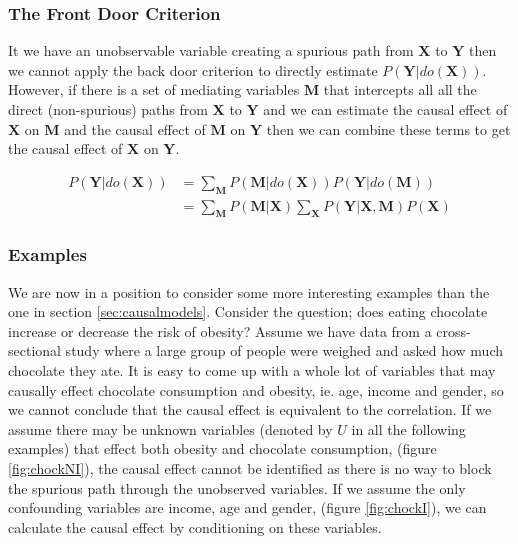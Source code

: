 \documentclass[11pt,a4paper]{article}
\begin{document}
\subsubsection{The Front Door Criterion}
It we have an unobservable variable creating a spurious path from $\boldsymbol{X}$ to $\boldsymbol{Y}$ then we cannot apply the back door criterion to directly estimate $P(\boldsymbol{Y}|do(\boldsymbol{X}))$. However, if there is a set of mediating variables $\boldsymbol{M}$ that intercepts all all the direct (non-spurious) paths from $\boldsymbol{X}$ to $\boldsymbol{Y}$ and we can estimate the causal effect of $\boldsymbol{X}$ on $\boldsymbol{M}$ and the causal effect of $\boldsymbol{M}$ on $\boldsymbol{Y}$ then we can combine these terms to get the causal effect of $\boldsymbol{X}$ on $\boldsymbol{Y}$. 

\begin{equation}
\begin {aligned}
P(\boldsymbol{Y}|do(\boldsymbol{X})) & = \sum_{\boldsymbol{M}}{P(\boldsymbol{M}|do(\boldsymbol{X}))P(\boldsymbol{Y}|do(\boldsymbol{M}))} \\
&= \sum_{\boldsymbol{M}}{P(\boldsymbol{M}|\boldsymbol{X})} \sum_{\boldsymbol{X}}P(\boldsymbol{Y}|\boldsymbol{X},\boldsymbol{M})P(\boldsymbol{X}) 
\end {aligned}
\end{equation}

\subsubsection{Examples}

We are now in a position to consider some more interesting examples than the one in section \ref{sec:causalmodels}. Consider the question; does eating chocolate increase or decrease the risk of obesity? Assume we have data from a cross-sectional study where a large group of people were weighed and asked how much chocolate they ate. It is easy to come up with a whole lot of variables that may causally effect chocolate consumption and obesity, ie. age, income and gender, so we cannot conclude that the causal effect is equivalent to the correlation. If we assume there may be unknown variables (denoted by $U$ in all the following examples) that effect both obesity and chocolate consumption, (figure \ref{fig:chockNI}), the causal effect cannot be identified as there is no way to block the spurious path through the unobserved variables. If we assume the only confounding variables are income, age and gender, (figure \ref{fig:chockI}), we can calculate the causal effect by conditioning on these variables.  
\end{document}
